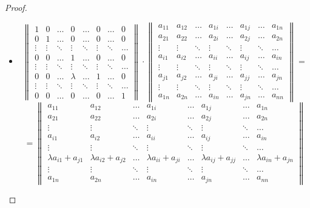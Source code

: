 \begin{proof}
\begin{itemize}
	\item \begin{equation*}
	\begin{Vmatrix}
	1 & 0 & \ldots & 0 & \ldots & 0 & \ldots & 0 \\
	0 & 1 & \ldots & 0 & \ldots & 0 & \ldots & 0 \\
	\vdots & \vdots & \ddots & \vdots & \ddots & \vdots & \ddots & \ldots \\
	0 & 0 & \ldots & 1 & \ldots & 0 & \ldots & 0 \\
	\vdots & \vdots & \ddots & \vdots & \ddots & \vdots & \ddots & \ldots \\
	0 & 0 & \ldots & \lambda & \ldots & 1 & \ldots & 0 \\
	\vdots & \vdots & \ddots & \vdots & \ddots & \vdots & \ddots & \ldots \\
	0 & 0 & \ldots & 0 & \ldots & 0 & \ldots & 1
	\end{Vmatrix} \cdot
	\begin{Vmatrix}
	a_{11} & a_{12} & \ldots & a_{1i} & \ldots & a_{1j} & \ldots & a_{1n} \\
	a_{21} & a_{22} & \ldots & a_{2i} & \ldots & a_{2j} & \ldots & a_{2n} \\
	\vdots & \vdots & \ddots & \vdots & \ddots & \vdots & \ddots & \ldots \\
	a_{i1} & a_{i2} & \ldots & a_{ii} & \ldots & a_{ij} & \ldots & a_{in} \\
	\vdots & \vdots & \ddots & \vdots & \ddots & \vdots & \ddots & \ldots \\
	a_{j1} & a_{j2} & \ldots & a_{ji} & \ldots & a_{jj} & \ldots & a_{jn} \\
	\vdots & \vdots & \ddots & \vdots & \ddots & \vdots & \ddots & \ldots \\
	a_{1n} & a_{2n} & \ldots & a_{in} & \ldots & a_{jn} & \ldots & a_{nn}
	\end{Vmatrix} =
	\end{equation*}
	\begin{equation*}
	= \begin{Vmatrix}
	a_{11} & a_{12} & \ldots & a_{1i} & \ldots & a_{1j} & \ldots & a_{1n} \\
	a_{21} & a_{22} & \ldots & a_{2i} & \ldots & a_{2j} & \ldots & a_{2n} \\
	\vdots & \vdots & \ddots & \vdots & \ddots & \vdots & \ddots & \ldots \\
	a_{i1} & a_{i2} & \ldots & a_{ii} & \ldots & a_{ij} & \ldots & a_{in} \\
	\vdots & \vdots & \ddots & \vdots & \ddots & \vdots & \ddots & \ldots \\
	\lambda a_{i1} + a_{j1} & \lambda a_{i2} + a_{j2} & \ldots & \lambda a_{ii} + a_{ji} & \ldots & \lambda a_{ij} + a_{jj} & \ldots & \lambda a_{in} + a_{jn} \\
	\vdots & \vdots & \ddots & \vdots & \ddots & \vdots & \ddots & \ldots \\
	a_{1n} & a_{2n} & \ldots & a_{in} & \ldots & a_{jn} & \ldots & a_{nn}
	\end{Vmatrix}
	\end{equation*}
\end{itemize}


\end{proof}
